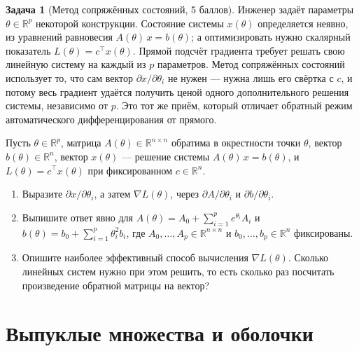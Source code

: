 \documentclass[11pt]{article}
\theoremstyle{definition}
\newtheorem{problem}{Задача}
\theoremstyle{remark}
\newcommand{\R}{\mathbb{R}}
\begin{document}
\begin{problem}[Метод сопряжённых состояний, 5 баллов]
Инженер задаёт параметры $\theta \in \mathbb R^p$ некоторой конструкции. Состояние системы $x(\theta)$ определяется неявно, из уравнений равновесия $A(\theta)\,x = b(\theta)$; а оптимизировать нужно скалярный показатель $L(\theta) = c^{\top} x(\theta)$. Прямой подсчёт градиента требует решать свою линейную систему на каждый из $p$ параметров. Метод сопряжённых состояний использует то, что сам вектор $\partial x/\partial\theta_i$ не нужен --- нужна лишь его свёртка с $c$, и потому весь градиент удаётся получить ценой одного дополнительного решения системы, независимо от $p$. Это тот же приём, который отличает обратный режим автоматического дифференцирования от прямого.

Пусть $\theta \in \R^{p}$, матрица $A(\theta) \in \R^{n \times n}$ обратима в окрестности точки
$\theta$, вектор $b(\theta) \in \R^{n}$, вектор $x(\theta)$ --- решение системы
$A(\theta)\,x = b(\theta)$, и $L(\theta) = c^{\top} x(\theta)$ при фиксированном $c \in \R^{n}$.
\begin{enumerate}[label=(\alph*), nosep]
  \item Выразите $\partial x / \partial \theta_i$, а затем $\nabla L(\theta)$, через
        $\partial A / \partial \theta_i$ и $\partial b / \partial \theta_i$.
  \item Выпишите ответ явно для $A(\theta) = A_0 + \sum_{i=1}^{p} e^{\theta_i} A_i$ и
        $b(\theta) = b_0 + \sum_{i=1}^{p} \theta_i^{2} b_i$, где
        $A_0, \dots, A_p \in \R^{n\times n}$ и $b_0, \dots, b_p \in \R^{n}$ фиксированы.
  \item Опишите наиболее эффективный способ вычисления $\nabla L(\theta)$. Сколько линейных систем
        нужно при этом решить, то есть сколько раз посчитать произведение обратной матрицы на
        вектор?
\end{enumerate}
\end{problem}

\section{Выпуклые множества и оболочки}
\end{document}
